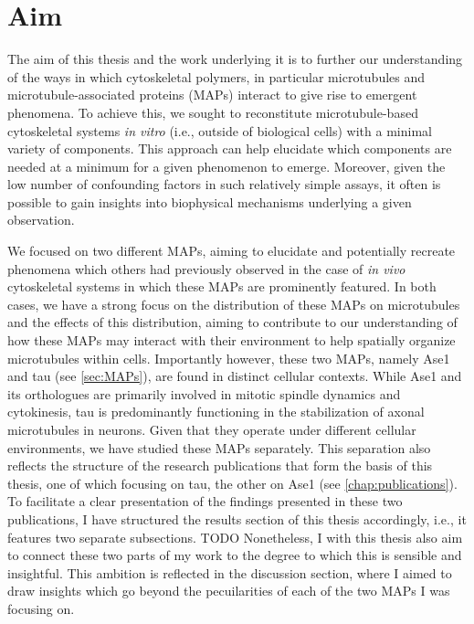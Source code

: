 \chapter{Aim}
The aim of this thesis and the work underlying it is to further our understanding of the ways in which cytoskeletal polymers, in particular microtubules and microtubule-associated proteins (MAPs) interact to give rise to emergent phenomena. To achieve this, we sought to reconstitute microtubule-based cytoskeletal systems \textit{in vitro} (i.e., outside of biological cells) with a minimal variety of components. This approach can help elucidate which components are needed at a minimum for a given phenomenon to emerge. Moreover, given the low number of confounding factors in such relatively simple assays, it often is possible to gain insights into biophysical mechanisms underlying a given observation. \par
We focused on two different MAPs, aiming to elucidate and potentially recreate phenomena which others had previously observed in the case of \textit{in vivo} cytoskeletal systems in which these MAPs are prominently featured. In both cases, we have a strong focus on the distribution of these MAPs on microtubules and the effects of this distribution, aiming to contribute to our understanding of how these MAPs may interact with their environment to help spatially organize microtubules within cells. Importantly however, these two MAPs, namely Ase1 and tau (see \autoref{sec:MAPs}), are found in distinct cellular contexts. While Ase1 and its orthologues are primarily involved in mitotic spindle dynamics and cytokinesis, tau is predominantly functioning in the stabilization of axonal microtubules in neurons. Given that they operate under different cellular environments, we have studied these MAPs separately. This separation also reflects the structure of the research publications that form the basis of this thesis, one of which focusing on tau, the other on Ase1 (see \autoref{chap:publications}). To facilitate a clear presentation of the findings presented in these two publications, I have structured the results section of this thesis accordingly, i.e., it features two separate subsections. TODO Nonetheless, I with this thesis also aim to connect these two parts of my work to the degree to which this is sensible and insightful. This ambition is reflected in the discussion section, where I aimed to draw insights which go beyond the pecuilarities of each of the two MAPs I was focusing on.